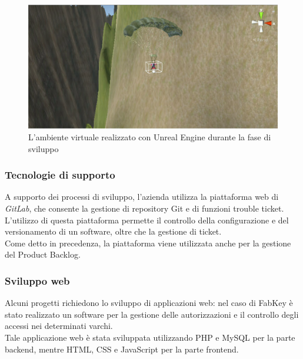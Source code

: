 \begin{figure}[H]
	\begin{center}
	\includegraphics[scale=0.22]{immagini/unity.png}
	\caption{L'ambiente virtuale realizzato con Unreal Engine durante la fase di sviluppo}
	\end{center}
\end{figure}

\subsubsection{Tecnologie di supporto}
A supporto dei processi di sviluppo, l'azienda utilizza la piattaforma web di \textit{GitLab}, che consente la gestione di repository Git e di funzioni trouble ticket.\\
L'utilizzo di questa piattaforma permette il controllo della configurazione e del versionamento di un software, oltre che la gestione di ticket.\\
Come detto in precedenza, la piattaforma viene utilizzata anche per la gestione del Product Backlog.

\subsubsection{Sviluppo web}
Alcuni progetti richiedono lo sviluppo di applicazioni web: nel caso di FabKey è stato realizzato un software per la gestione delle autorizzazioni e il controllo degli accessi nei determinati varchi.\\
Tale applicazione web è stata sviluppata utilizzando PHP e MySQL per la parte backend, mentre HTML, CSS e JavaScript per la parte frontend.

